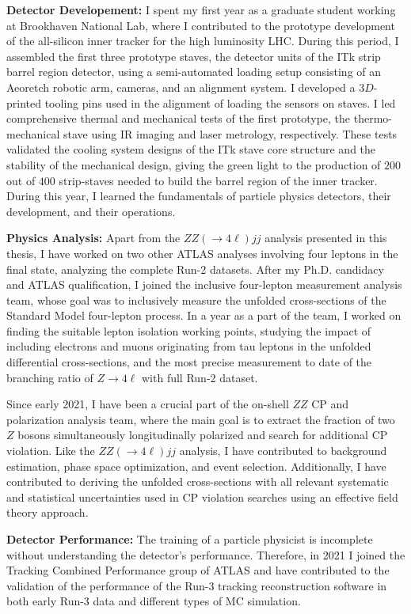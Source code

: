 \textbf{Detector Developement:}
I spent my first year as a graduate student working at Brookhaven National Lab, where I contributed to the prototype development of the all-silicon inner tracker for the high luminosity LHC. During this period, I assembled the first three prototype staves, the detector units of the ITk strip barrel region detector, using a semi-automated loading setup consisting of an Aeoretch robotic arm, cameras, and an alignment system. I developed a $3D$-printed tooling pins used in the alignment of loading the sensors on staves. I led comprehensive thermal and mechanical tests of the first prototype, the thermo-mechanical stave using IR imaging and laser metrology, respectively. These tests validated the cooling system designs of the ITk stave core structure and the stability of the mechanical design, giving the green light to the production of $200$ out of $400$ strip-staves needed to build the barrel region of the inner tracker. During this year, I learned the fundamentals of particle physics detectors, their development, and their operations.  

\textbf{Physics Analysis:}
Apart from the $ZZ(\rightarrow 4\ell)jj$ analysis presented in this thesis, I have worked on two other ATLAS analyses involving four leptons in the final state, analyzing the complete Run-2 datasets. After my Ph.D. candidacy and ATLAS qualification, I joined the inclusive four-lepton measurement analysis team, whose goal was to inclusively measure the unfolded cross-sections of the Standard Model four-lepton process. In a year as a part of the team, I worked on finding the suitable lepton isolation working points, studying the impact of including electrons and muons originating from tau leptons in the unfolded differential cross-sections, and the most precise measurement to date of the branching ratio of $ Z \to 4\ell$ with full Run-2 dataset.

Since early 2021, I have been a crucial part of the on-shell $ZZ$ CP and polarization analysis team, where the main goal is to extract the fraction of two $Z$ bosons simultaneously longitudinally polarized and search for additional CP violation. Like the $ZZ(\rightarrow 4\ell)jj$ analysis, I have contributed to background estimation, phase space optimization, and event selection. Additionally, I have contributed to deriving the unfolded cross-sections with all relevant systematic and statistical uncertainties used in CP violation searches using an effective field theory approach. 

\textbf{Detector Performance: }
The training of a particle physicist is incomplete without understanding the detector's performance. Therefore, in 2021 I joined the Tracking Combined Performance group of ATLAS and have contributed to the validation of the performance of the Run-3 tracking reconstruction software in both early Run-3 data and different types of MC simulation. 

